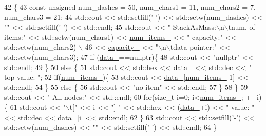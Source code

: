 \begin{DoxyCode}
42                                    \{
43         \textcolor{keyword}{const} \textcolor{keywordtype}{unsigned} num\_dashes = 50, num\_chars1 = 11, num\_chars2 = 7, num\_chars3 = 21;
44         std::cout << std::setfill(\textcolor{charliteral}{'-'}) << std::setw(num\_dashes) << \textcolor{stringliteral}{""} << std::setfill(\textcolor{charliteral}{' '}) << std::endl;
45         std::cout << \textcolor{stringliteral}{"   StackAsMass:\(\backslash\)n\(\backslash\)tnum. of items:"} << std::setw(num\_chars1) << 
      \hyperlink{classstk_1_1_stack_as_mass_a5e9451aac734a824c73b3d7054093fef}{num\_items\_} << \textcolor{stringliteral}{" capacity:"} << std::setw(num\_chars2) \(\backslash\)
46             << \hyperlink{classstk_1_1_stack_as_mass_aa03eca24b4a73e040690da8a14ffef8b}{capacity\_} << \textcolor{stringliteral}{"\(\backslash\)n\(\backslash\)tdata pointer:"} << std::setw(num\_chars3);
47         \textcolor{keywordflow}{if} (\hyperlink{classstk_1_1_stack_as_mass_a15bf94917c32ed7f450f22de28d14467}{data\_}==\textcolor{keyword}{nullptr})\{
48             std::cout << \textcolor{stringliteral}{"nullptr"} << std::endl;
49         \}
50         \textcolor{keywordflow}{else} \{
51             std::cout << std::hex << \hyperlink{classstk_1_1_stack_as_mass_a15bf94917c32ed7f450f22de28d14467}{data\_} << std::dec << \textcolor{stringliteral}{" top value: "};
52             \textcolor{keywordflow}{if}(\hyperlink{classstk_1_1_stack_as_mass_a5e9451aac734a824c73b3d7054093fef}{num\_items\_})\{
53                 std::cout << \hyperlink{classstk_1_1_stack_as_mass_a15bf94917c32ed7f450f22de28d14467}{data\_}[\hyperlink{classstk_1_1_stack_as_mass_a5e9451aac734a824c73b3d7054093fef}{num\_items\_}-1] << std::endl;
54             \}
55             \textcolor{keywordflow}{else} \{
56                 std::cout << \textcolor{stringliteral}{"no item"} << std::endl;
57             \}
58         \}
59         std::cout << \textcolor{stringliteral}{"    All nodes:"} << std::endl;
60         \textcolor{keywordflow}{for}(\textcolor{keywordtype}{size\_t} i=0; i<\hyperlink{classstk_1_1_stack_as_mass_a5e9451aac734a824c73b3d7054093fef}{num\_items\_}; ++i)\{
61             std::cout << \textcolor{stringliteral}{"\(\backslash\)t["} << i << \textcolor{stringliteral}{"] "} << std::hex << (\hyperlink{classstk_1_1_stack_as_mass_a15bf94917c32ed7f450f22de28d14467}{data\_}+i) << \textcolor{stringliteral}{" value: "} << std::dec << 
      \hyperlink{classstk_1_1_stack_as_mass_a15bf94917c32ed7f450f22de28d14467}{data\_}[i] << std::endl;
62         \}
63         std::cout << std::setfill(\textcolor{charliteral}{'-'}) << std::setw(num\_dashes) << \textcolor{stringliteral}{""} << std::setfill(\textcolor{charliteral}{' '}) << std::endl;
64     \}
\end{DoxyCode}
\hypertarget{classstk_1_1_stack_as_mass_a0e8e793c3f09ebe95679a4a588f7973d}{}
